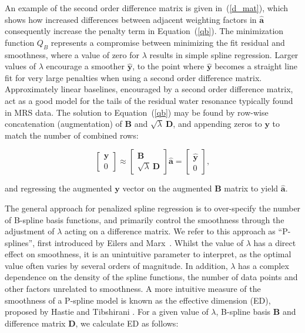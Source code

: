 \documentclass[num-refs]{wiley-article}
\begin{document}
An example of the second order difference matrix is given in~(\ref{d_mat}), which shows how increased differences between adjacent weighting factors in $\hat{\mathbf{a}}$ consequently increase the penalty term in Equation~(\ref{qb}). The minimization function $Q_{B}$ represents a compromise between minimizing the fit residual and smoothness, where a value of zero for $\lambda$ results in simple spline regression. Larger values of $\lambda$ encourage a smoother $\hat{\mathbf{y}}$, to the point where $\hat{\mathbf{y}}$ becomes a straight line fit for very large penalties when using a second order difference matrix. Approximately linear baselines, encouraged by a second order difference matrix, act as a good model for the tails of the residual water resonance typically found in MRS data. The solution to Equation~(\ref{qb}) may be found by row-wise concatenation (augmentation) of $\mathbf{B}$ and $\sqrt{\lambda} \ \mathbf{D}$, and appending zeros to $\mathbf{y}$ to match the number of combined rows:

\begin{equation}
  \begin{bmatrix}
    \mathbf{y} \\ 0
  \end{bmatrix}
  \approx
  \begin{bmatrix}
    \mathbf{B} \\ \sqrt{\lambda} \ \mathbf{D}
  \end{bmatrix} \hat{\mathbf{a}} =
  \begin{bmatrix}
    \hat{\mathbf{y}} \\ 0
  \end{bmatrix},
  \label{p-spline_eq}
\end{equation}

and regressing the augmented $\mathbf{y}$ vector on the augmented $\mathbf{B}$ matrix to yield $\hat{\mathbf{a}}$.

The general approach for penalized spline regression is to over-specify the number of B-spline basis functions, and primarily control the smoothness through the adjustment of $\lambda$ acting on a difference matrix. We refer to this approach as ``P-splines'', first introduced by Eilers and Marx~\cite{Eilers1996}. Whilst the value of $\lambda$ has a direct effect on smoothness, it is an unintuitive parameter to interpret, as the optimal value often varies by several orders of magnitude. In addition, $\lambda$ has a complex dependence on the density of the spline functions, the number of data points and other factors unrelated to smoothness. A more intuitive measure of the smoothness of a P-spline model is known as the effective dimension (ED), proposed by Hastie and Tibshirani \cite{Hastie1990}. For a given value of $\lambda$, B-spline basis $\mathbf{B}$ and difference matrix $\mathbf{D}$, we calculate ED as follows:
\end{document}
